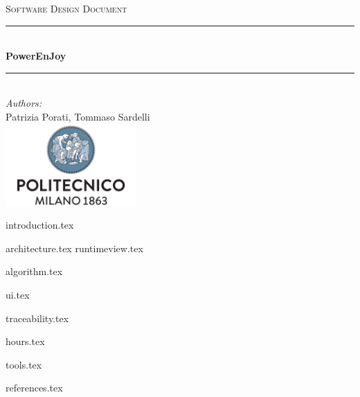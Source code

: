 \documentclass[a4paper,11pt]{article}
\begin{document}
\begin{titlepage}
\begin{center}
\textsc{\LARGE Software Design Document}\\[1.5cm] %

\rule{\linewidth}{0.5mm} \\[0.7cm]
{\huge \bfseries PowerEnJoy}\\[0.4cm] %
\rule{\linewidth}{0.5mm} \\[1.5cm]

\emph{Authors:}\\
Patrizia Porati, Tommaso Sardelli\\[2.0cm]

\vfill
\vfill
\includegraphics[width=50mm]{polimi.png}\\
\end{center}
\end{titlepage}

\tableofcontents
\pagebreak

{introduction.tex}

{architecture.tex}
{runtimeview.tex}

{algorithm.tex}

{ui.tex}

{traceability.tex}

{hours.tex}

{tools.tex}

{references.tex}

\end{document}
